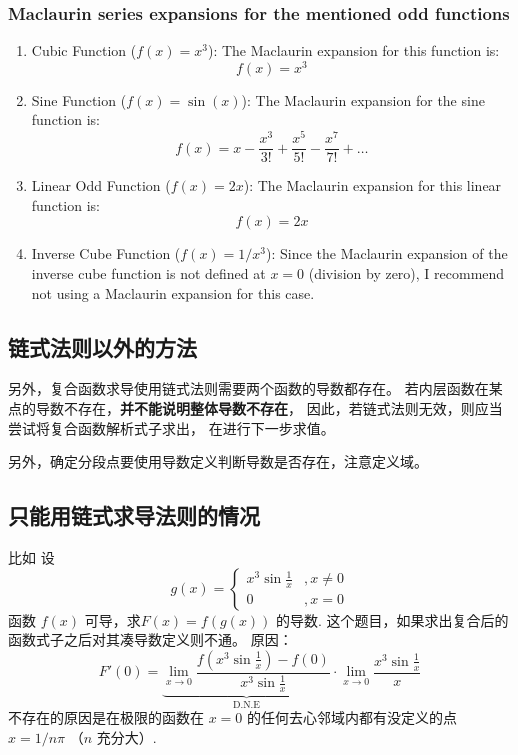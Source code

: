 \subsubsection{Maclaurin series expansions for the mentioned odd functions}

\begin{enumerate}
    \item Cubic Function ($f(x) = x^3$):
       The Maclaurin expansion for this function is:
       $$f(x) = x^3$$

    \item Sine Function ($f(x) = \sin(x)$):
       The Maclaurin expansion for the sine function is:
       $$f(x) = x - \frac{x^3}{3!} + \frac{x^5}{5!} - \frac{x^7}{7!} + \ldots$$

    \item Linear Odd Function ($f(x) = 2x$):
       The Maclaurin expansion for this linear function is:
       $$f(x) = 2x$$

    \item Inverse Cube Function ($f(x) = 1/x^3$):
       Since the Maclaurin expansion of the inverse cube function is not defined at $x = 0$ (division by zero), I recommend not using a Maclaurin expansion for this case.
\end{enumerate}

\subsection{链式法则以外的方法}

另外，复合函数求导使用链式法则需要两个函数的导数都存在。
若内层函数在某点的导数不存在，\textbf{并不能说明整体导数不存在}，
因此，若链式法则无效，则应当尝试将复合函数解析式子求出，
在进行下一步求值。

另外，确定分段点要使用导数定义判断导数是否存在，注意定义域。

\subsection{只能用链式求导法则的情况}

比如 设
\[
    g(x) = 
    \left\{
        \begin{array}{rl}
            x^3 \sin \frac{1}{x} &, x \neq 0 \\
            0  &, x = 0
        \end{array}
    \right.
\]
函数 $f(x)$ 可导，求$F(x)=f(g(x))$ 的导数.
这个题目，如果求出复合后的函数式子之后对其凑导数定义则不通。
原因：
\[
    F'(0) = \underbrace{\lim_{x \to 0} \dfrac{f(x^3 \sin \frac{1}{x}) - f(0)}{x^3 \sin \frac{1}{x}}}_{\mbox{D.N.E}}
    \cdot \lim_{x \to 0} \dfrac{x^3 \sin \frac{1}{x}}{x}
\]
不存在的原因是在极限的函数在 $x=0$ 的任何去心邻域内都有没定义的点 $x = 1/n\pi$ （$n$ 充分大）.

